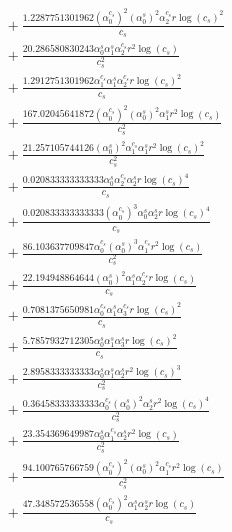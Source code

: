 \documentclass[10pt]{article}
\begin{document}
\begin{align*}
&{}  + \frac{1.2287751301962 \left(\alpha_{0}^{c_s}\right)^{2} \left(\alpha_{0}^s\right)^{2} \alpha_{2}^{c_s} r \log{\left(c_{s} \right)}^{2}}{c_{s}} \\
&{}  + \frac{20.286580830243 \alpha_{0}^s \alpha_{1}^s \alpha_{2}^{c_s} r^{2} \log{\left(c_{s} \right)}}{c_{s}^{2}} \\
&{}  + \frac{1.2912751301962 \alpha_{1}^{c_s} \alpha_{1}^s \alpha_{2}^{c_s} r \log{\left(c_{s} \right)}^{2}}{c_{s}} \\
&{}  + \frac{167.02045641872 \left(\alpha_{0}^{c_s}\right)^{2} \left(\alpha_{0}^s\right)^{2} \alpha_{1}^s r^{2} \log{\left(c_{s} \right)}}{c_{s}^{2}} \\
&{}  + \frac{21.257105744126 \left(\alpha_{0}^s\right)^{2} \alpha_{1}^{c_s} \alpha_{1}^s r^{2} \log{\left(c_{s} \right)}^{2}}{c_{s}^{2}} \\
&{}  + \frac{0.020833333333333 \alpha_{0}^s \alpha_{2}^{c_s} \alpha_{2}^s r \log{\left(c_{s} \right)}^{4}}{c_{s}} \\
&{}  + \frac{0.020833333333333 \left(\alpha_{0}^{c_s}\right)^{3} \alpha_{0}^s \alpha_{2}^s r \log{\left(c_{s} \right)}^{4}}{c_{s}} \\
&{}  + \frac{86.103637709847 \alpha_{0}^{c_s} \left(\alpha_{0}^s\right)^{3} \alpha_{1}^{c_s} r^{2} \log{\left(c_{s} \right)}}{c_{s}^{2}} \\
&{}  + \frac{22.194948864644 \left(\alpha_{0}^s\right)^{2} \alpha_{1}^s \alpha_{2}^{c_s} r \log{\left(c_{s} \right)}}{c_{s}} \\
&{}  + \frac{0.7081375650981 \alpha_{0}^{c_s} \alpha_{1}^s \alpha_{3}^{c_s} r \log{\left(c_{s} \right)}^{2}}{c_{s}} \\
&{}  + \frac{5.7857932712305 \alpha_{0}^s \alpha_{1}^s \alpha_{3}^s r \log{\left(c_{s} \right)}^{2}}{c_{s}} \\
&{}  + \frac{2.8958333333333 \alpha_{0}^s \alpha_{1}^s \alpha_{2}^s r^{2} \log{\left(c_{s} \right)}^{3}}{c_{s}^{2}} \\
&{}  + \frac{0.36458333333333 \alpha_{0}^{c_s} \left(\alpha_{0}^s\right)^{2} \alpha_{2}^s r^{2} \log{\left(c_{s} \right)}^{4}}{c_{s}^{2}} \\
&{}  + \frac{23.354369649987 \alpha_{0}^s \alpha_{1}^{c_s} \alpha_{2}^s r^{2} \log{\left(c_{s} \right)}}{c_{s}^{2}} \\
&{}  + \frac{94.100765766759 \left(\alpha_{0}^{c_s}\right)^{2} \left(\alpha_{0}^s\right)^{2} \alpha_{1}^{c_s} r^{2} \log{\left(c_{s} \right)}}{c_{s}^{2}} \\
&{}  + \frac{47.348572536558 \left(\alpha_{0}^{c_s}\right)^{2} \alpha_{1}^s \alpha_{2}^s r \log{\left(c_{s} \right)}}{c_{s}} \\

\end{align*}
\end{document}
